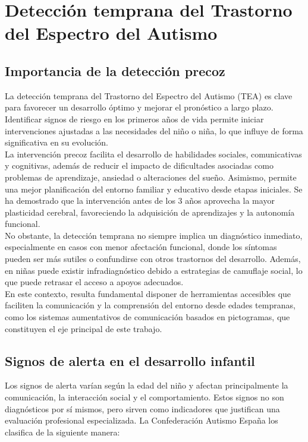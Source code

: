 \documentclass{article}
\begin{document}
\section{\textbf{Detección temprana del Trastorno del Espectro del Autismo}}
\subsection{\textbf{Importancia de la detección precoz}}
La detección temprana del Trastorno del Espectro del Autismo (TEA) es clave para favorecer un desarrollo óptimo y mejorar el pronóstico a largo plazo. Identificar signos de riesgo en los primeros años de vida permite iniciar intervenciones ajustadas a las necesidades del niño o niña, lo que influye de forma significativa en su evolución.\\

La intervención precoz facilita el desarrollo de habilidades sociales, comunicativas y cognitivas, además de reducir el impacto de dificultades asociadas como problemas de aprendizaje, ansiedad o alteraciones del sueño. Asimismo, permite una mejor planificación del entorno familiar y educativo desde etapas iniciales. Se ha demostrado que la intervención antes de los 3 años aprovecha la mayor plasticidad cerebral, favoreciendo la adquisición de aprendizajes y la autonomía funcional.\\

No obstante, la detección temprana no siempre implica un diagnóstico inmediato, especialmente en casos con menor afectación funcional, donde los síntomas pueden ser más sutiles o confundirse con otros trastornos del desarrollo. Además, en niñas puede existir infradiagnóstico debido a estrategias de camuflaje social, lo que puede retrasar el acceso a apoyos adecuados.\\

En este contexto, resulta fundamental disponer de herramientas accesibles que faciliten la comunicación y la comprensión del entorno desde edades tempranas, como los sistemas aumentativos de comunicación basados en pictogramas, que constituyen el eje principal de este trabajo.

\subsection{\textbf{Signos de alerta en el desarrollo infantil}}
Los signos de alerta varían según la edad del niño y afectan principalmente la comunicación, la interacción social y el comportamiento. Estos signos no son diagnósticos por sí mismos, pero sirven como indicadores que justifican una evaluación profesional especializada. La Confederación Autismo España los clasifica de la siguiente manera:
\end{document}
